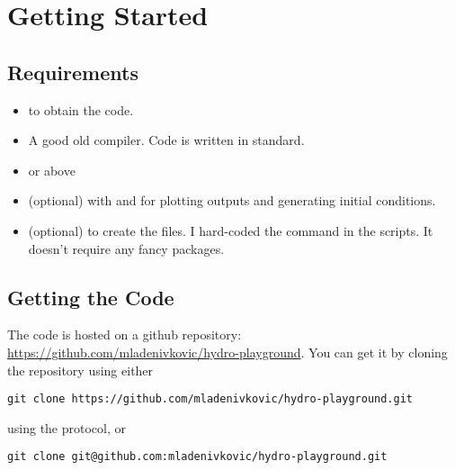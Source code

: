 \newpage
\section{Getting Started}


\subsection{Requirements}

\begin{itemize}
\item   {} to obtain the code.
\item   A good old  compiler. Code is written in 
        standard.
\item   {} or above
\item   (optional)  with  and
         for plotting outputs and generating initial
        conditions.
\item   (optional)  to create the  files. I
        hard-coded the  command in the scripts. It doesn't
        require any fancy  packages.
\end{itemize}





\subsection{Getting the Code}


The code is hosted on a github repository:
\url{https://github.com/mladenivkovic/hydro-playground}. You can get it by
cloning the repository using either

\begin{lstlisting}
git clone https://github.com/mladenivkovic/hydro-playground.git
\end{lstlisting}


using the  protocol, or

\begin{lstlisting}
git clone git@github.com:mladenivkovic/hydro-playground.git
\end{lstlisting}

